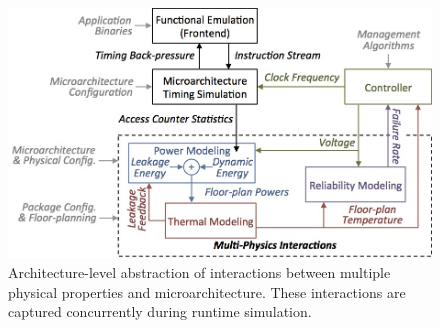 \begin{figure}[h]
\centering
\includegraphics[width=0.6 \textwidth]{figures/interactive_simulation.jpg}
\caption{Architecture-level abstraction of interactions between multiple physical properties and microarchitecture. These interactions are captured concurrently during runtime simulation.}
\label{fig:interactive_simulation}
\end{figure}

\pagebreak
